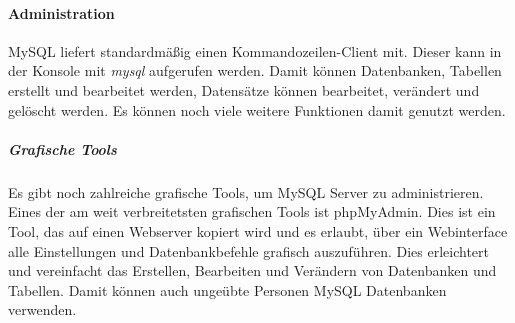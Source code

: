 \paragraph{Administration}
MySQL liefert standardmäßig einen Kommandozeilen-Client mit. Dieser kann in der Konsole mit \textit{mysql} aufgerufen werden. Damit können Datenbanken, Tabellen erstellt und bearbeitet werden, Datensätze können bearbeitet, verändert und gelöscht werden. Es können noch viele weitere Funktionen damit genutzt werden.\\
\subparagraph{Grafische Tools}
Es gibt noch zahlreiche grafische Tools, um MySQL Server zu administrieren. Eines der am weit verbreitetsten grafischen Tools ist phpMyAdmin. Dies ist ein Tool, das auf einen Webserver kopiert wird und es erlaubt, über ein Webinterface alle Einstellungen und Datenbankbefehle grafisch auszuführen. Dies erleichtert und vereinfacht das Erstellen, Bearbeiten und Verändern von Datenbanken und Tabellen. Damit können auch ungeübte Personen MySQL Datenbanken verwenden.
